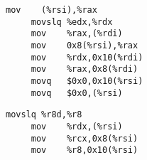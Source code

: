 \begin{lstlisting}[caption={Transaction code, do\_move, optimized for size.
Eight instructions, seven memory accesses (five writes).},label=lst:moveOs]
     mov    (%rsi),%rax
     movslq %edx,%rdx
     mov    %rax,(%rdi)
     mov    0x8(%rsi),%rax
     mov    %rdx,0x10(%rdi)
     mov    %rax,0x8(%rdi)
     movq   $0x0,0x10(%rsi)
     movq   $0x0,(%rsi)
\end{lstlisting}

\begin{lstlisting}[caption={Transaction code, do\_insert, optimized for size.
Four instructions, three memory accesses (three writes).},label=lst:insertOs]
     movslq %r8d,%r8
     mov    %rdx,(%rsi)
     mov    %rcx,0x8(%rsi)
     mov    %r8,0x10(%rsi)
\end{lstlisting}



